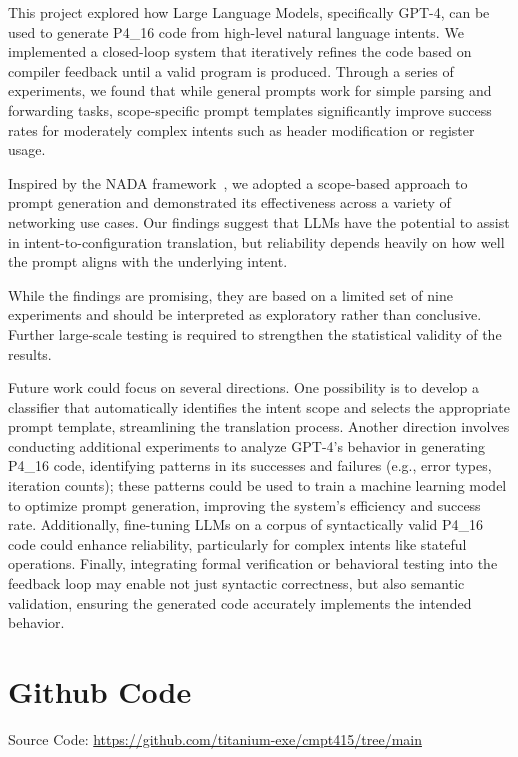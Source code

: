 \documentclass[sigconf]{acmart}
\begin{document}
This project explored how Large Language Models, specifically GPT-4, can be used to generate P4\_16 code from high-level natural language intents. We implemented a closed-loop system that iteratively refines the code based on compiler feedback until a valid program is produced. Through a series of experiments, we found that while general prompts work for simple parsing and forwarding tasks, scope-specific prompt templates significantly improve success rates for moderately complex intents such as header modification or register usage.

Inspired by the NADA framework~\cite{he2024nada}, we adopted a scope-based approach to prompt generation and demonstrated its effectiveness across a variety of networking use cases. Our findings suggest that LLMs have the potential to assist in intent-to-configuration translation, but reliability depends heavily on how well the prompt aligns with the underlying intent.

While the findings are promising, they are based on a limited set of nine experiments and should be interpreted as exploratory rather than conclusive. Further large-scale testing is required to strengthen the statistical validity of the results.

Future work could focus on several directions. One possibility is to develop a classifier that automatically identifies the intent scope and selects the appropriate prompt template, streamlining the translation process. Another direction involves conducting additional experiments to analyze GPT-4’s behavior in generating P4\_16 code, identifying patterns in its successes and failures (e.g., error types, iteration counts); these patterns could be used to train a machine learning model to optimize prompt generation, improving the system’s efficiency and success rate. Additionally, fine-tuning LLMs on a corpus of syntactically valid P4\_16 code could enhance reliability, particularly for complex intents like stateful operations. Finally, integrating formal verification or behavioral testing into the feedback loop may enable not just syntactic correctness, but also semantic validation, ensuring the generated code accurately implements the intended behavior.

\section{Github Code}
Source Code:
\url{https://github.com/titanium-exe/cmpt415/tree/main}




\end{document}
